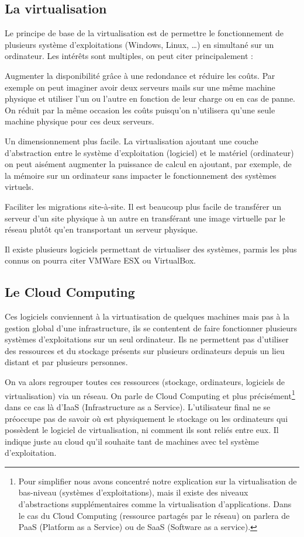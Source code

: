 \documentclass{report}
\begin{document}
\subsection{La virtualisation}
Le principe de base de la virtualisation est de permettre le fonctionnement de plusieurs système d’exploitations (Windows, Linux, …) en simultané sur un ordinateur.
Les intérêts sont multiples, on peut citer principalement :\newline

Augmenter la disponibilité grâce à une redondance et réduire les coûts. Par exemple on peut imaginer avoir deux serveurs mails sur une même machine physique et utiliser l’un ou l’autre en fonction de leur charge ou en cas de panne. On réduit par la même occasion les coûts puisqu’on n’utilisera qu’une seule machine physique pour ces deux serveurs.

Un dimensionnement plus facile. La virtualisation ajoutant une couche d’abstraction entre le système d’exploitation (logiciel) et le matériel (ordinateur) on peut aisément augmenter la puissance de calcul en ajoutant, par exemple, de la mémoire sur un ordinateur sans impacter le fonctionnement des systèmes virtuels.

Faciliter les migrations site-à-site. Il est beaucoup plus facile de transférer un serveur d’un site physique à un autre en transférant une image virtuelle par le réseau plutôt qu’en transportant un serveur physique.\newline

Il existe plusieurs logiciels permettant de virtualiser des systèmes, parmis les plus connus on pourra citer VMWare ESX ou VirtualBox.

\subsection{Le Cloud Computing}
Ces logiciels conviennent à la virtuatisation de quelques machines mais pas à la gestion global d'une infrastructure, ils se contentent de faire fonctionner plusieurs systèmes d’exploitations sur un seul ordinateur. Ils ne permettent pas d'utiliser des ressources et du stockage présents sur plusieurs ordinateurs depuis un lieu distant et par plusieurs personnes.

On va alors regrouper toutes ces ressources (stockage, ordinateurs, logiciels de virtualisation) via un réseau. On parle de Cloud Computing et plus précisément\footnote{Pour simplifier nous avons concentré notre explication sur la virtualisation de bas-niveau (systèmes d’exploitations), mais il existe des niveaux d’abstractions supplémentaires comme la virtualisation d’applications. Dans le cas du Cloud Computing (ressource partagés par le réseau) on parlera de PaaS (Platform as a Service) ou de SaaS (Software as a service).} dans ce cas là d’IaaS (Infrastructure as a Service).
L’utilisateur final ne se préoccupe pas de savoir où est physiquement le stockage ou les ordinateurs qui possèdent le logiciel de virtualisation, ni comment ils sont reliés entre eux. Il indique juste au cloud qu’il souhaite tant de machines avec tel système d’exploitation.
\end{document}
